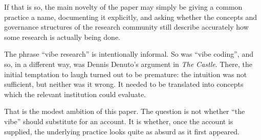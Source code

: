 \documentclass[12pt]{article}
\begin{document}
If that is so, the main novelty of the paper may simply be giving a common practice a name, documenting it explicitly, and asking whether the concepts and governance structures of the research community still describe accurately how some research is actually being done.

The phrase ``vibe research'' is intentionally informal. So was ``vibe coding'', and so, in a different way, was Dennis Denuto's argument in \emph{The Castle}. There, the initial temptation to laugh turned out to be premature: the intuition was not sufficient, but neither was it wrong. It needed to be translated into concepts which the relevant institution could evaluate.

That is the modest ambition of this paper. The question is not whether ``the vibe'' should substitute for an account. It is whether, once the account is supplied, the underlying practice looks quite as absurd as it first appeared.

{}


\end{document}
